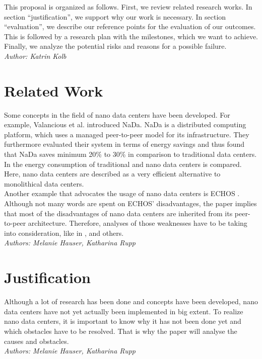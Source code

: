 \documentclass[sigchi-a, authorversion]{acmart}
\begin{document}
This proposal is organized as follows. First, we review related research works. In section ``justification'', we support why our work is necessary. In section ``evaluation'', we describe our reference points for the evaluation of our outcomes. This is followed by a research plan with the milestones, which we want to achieve. Finally, we analyze the potential risks and reasons for a possible failure.\\
\textit{Author: Katrin Kolb}\\


\section{Related Work} %
Some concepts in the field of nano data centers have been developed. For example, Valancious et al. \cite{DBLP:conf/conext/ValanciusLMDR09} introduced NaDa. NaDa is a distributed computing platform, which uses a managed peer-to-peer model for its infrastructure. They furthermore evaluated their system in terms of energy savings and thus found that NaDa saves minimum 20\% to 30\% in comparison to traditional data centers. \\
In \cite{DBLP:journals/sigmetrics/JalaliAVHAT14} the energy consumption of traditional and nano data centers is compared. Here, nano data centers are described as a very efficient alternative to monolithical data centers.\\
Another example that advocates the usage of nano data centers is ECHOS \cite{Laoutaris:2008:EEC:1341431.1341442}. Although not many words are spent on ECHOS' disadvantages, the paper implies that most of the disadvantages of nano data centers are inherited from its peer-to-peer architecture. Therefore, analyses of those weaknesses have to be taking into consideration, like in \cite{Dumitriu:2005:DoS}, \cite{Mhapasekar:2011:anonymity} and others.
\\
\textit{Authors: Melanie Hauser, Katharina Rupp}\\

\section{Justification} %
Although a lot of research has been done and concepts have been developed, nano data centers have not yet actually been implemented in big extent. To realize nano data centers, it is important to know why it has not been done yet and which obstacles have to be resolved. That is why the paper will analyse the causes and obstacles.\\
\textit{Authors: Melanie Hauser, Katharina Rupp}\\
\end{document}
